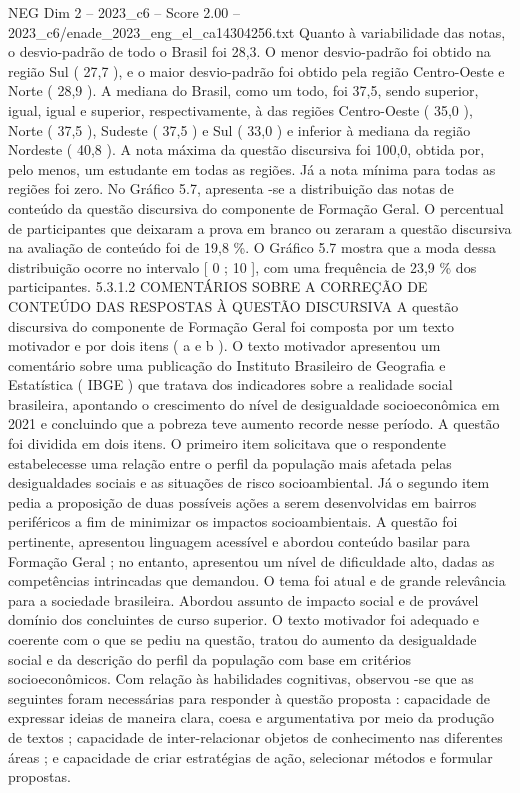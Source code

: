 \begin{textsample}{NEG Dim 2 – 2023\_c6 – Score 2.00 – 2023\_c6/enade\_2023\_eng\_el\_ca14304256.txt}
Quanto à variabilidade das notas, o desvio-padrão de todo o Brasil foi 28,3.
O menor desvio-padrão foi obtido na região Sul ( 27,7 ), e o maior desvio-padrão foi obtido pela região Centro-Oeste e Norte ( 28,9 ).
A mediana do Brasil, como um todo, foi 37,5, sendo superior, igual, igual e superior, respectivamente, à das regiões Centro-Oeste ( 35,0 ), Norte ( 37,5 ), Sudeste ( 37,5 ) e Sul ( 33,0 ) e inferior à mediana da região Nordeste ( 40,8 ).
A nota máxima da questão discursiva foi 100,0, obtida por, pelo menos, um estudante em todas as regiões.
Já a nota mínima para todas as regiões foi zero.
No Gráfico 5.7, apresenta -se a distribuição das notas de conteúdo da questão discursiva do componente de Formação Geral.
O percentual de participantes que deixaram a prova em branco ou zeraram a questão discursiva na avaliação de conteúdo foi de 19,8 \%.
O Gráfico 5.7 mostra que a moda dessa distribuição ocorre no intervalo [ 0 ; 10 ], com uma frequência de 23,9 \% dos participantes. 5.3.1.2 COMENTÁRIOS SOBRE A CORREÇÃO DE CONTEÚDO DAS RESPOSTAS À QUESTÃO DISCURSIVA A questão discursiva do componente de Formação Geral foi composta por um texto motivador e por dois itens ( a e b ).
O texto motivador apresentou um comentário sobre uma publicação do Instituto Brasileiro de Geografia e Estatística ( IBGE ) que tratava dos indicadores sobre a realidade social brasileira, apontando o crescimento do nível de desigualdade socioeconômica em 2021 e concluindo que a pobreza teve aumento recorde nesse período.
A questão foi dividida em dois itens.
O primeiro item solicitava que o respondente estabelecesse uma relação entre o perfil da população mais afetada pelas desigualdades sociais e as situações de risco socioambiental.
Já o segundo item pedia a proposição de duas possíveis ações a serem desenvolvidas em bairros periféricos a fim de minimizar os impactos socioambientais.
A questão foi pertinente, apresentou linguagem acessível e abordou conteúdo basilar para Formação Geral ; no entanto, apresentou um nível de dificuldade alto, dadas as competências intrincadas que demandou.
O tema foi atual e de grande relevância para a sociedade brasileira.
Abordou assunto de impacto social e de provável domínio dos concluintes de curso superior.
O texto motivador foi adequado e coerente com o que se pediu na questão, tratou do aumento da desigualdade social e da descrição do perfil da população com base em critérios socioeconômicos.
Com relação às habilidades cognitivas, observou -se que as seguintes foram necessárias para responder à questão proposta : capacidade de expressar ideias de maneira clara, coesa e argumentativa por meio da produção de textos ; capacidade de inter-relacionar objetos de conhecimento nas diferentes áreas ; e capacidade de criar estratégias de ação, selecionar métodos e formular propostas.

\end{textsample}
